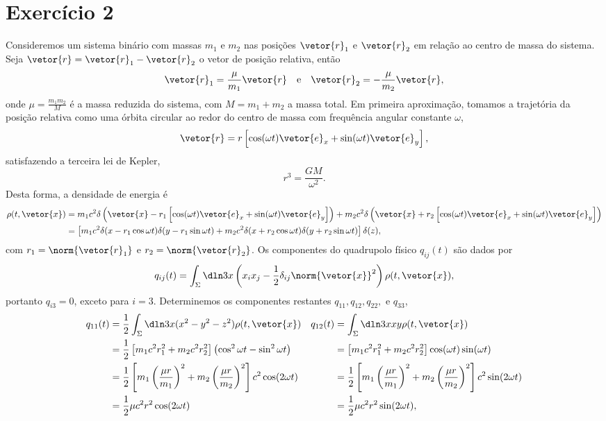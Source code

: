\section*{Exercício 2}
Consideremos um sistema binário com massas \(m_1\) e \(m_2\) nas posições \(\vetor{r}_1\) e \(\vetor{r}_2\) em relação ao centro de massa do sistema. Seja \(\vetor{r} = \vetor{r}_1 - \vetor{r}_2\) o vetor de posição relativa, então
\begin{equation*}
    \vetor{r}_1 = \frac{\mu}{m_1}\vetor{r}\quad\text{e}\quad \vetor{r}_2 =-\frac{\mu}{m_2}\vetor{r},
\end{equation*}
onde \(\mu = \frac{m_1m_2}{M}\) é a massa reduzida do sistema, com \(M = m_1 + m_2\) a massa total. Em primeira aproximação, tomamos a trajetória da posição relativa como uma órbita circular ao redor do centro de massa com frequência angular constante \(\omega\),
\begin{equation*}
    \vetor{r} = r \left[\cos(\omega t) \vetor{e}_x + \sin(\omega t)\vetor{e}_y\right],
\end{equation*}
satisfazendo a terceira lei de Kepler,
\begin{equation*}
    r^3 = \frac{GM}{\omega^2}.
\end{equation*}
Desta forma, a densidade de energia é
\begin{align*}
    \rho(t, \vetor{x}) &= m_1c^2\delta\left(\vetor{x} - r_1\left[\cos(\omega t) \vetor{e}_x + \sin(\omega t)\vetor{e}_y\right]\right) + m_2c^2 \delta\left(\vetor{x} + r_2\left[\cos(\omega t) \vetor{e}_x + \sin(\omega t)\vetor{e}_y\right]\right)\\
                       &= \left[m_1c^2 \delta(x - r_1 \cos\omega t)\delta(y - r_1\sin\omega t) + m_2c^2 \delta(x + r_2 \cos\omega t)\delta(y + r_2 \sin\omega t)\right]\delta(z),
\end{align*}
com \(r_1 = \norm{\vetor{r}_1}\) e \(r_2 = \norm{\vetor{r}_2}\). Os componentes do quadrupolo físico \(q_{ij}(t)\) são dados por
\begin{equation*}
    q_{ij}(t) = \int_{\Sigma} \dln3x\left(x_ix_j - \frac12 \delta_{ij}\norm{\vetor{x}}^2\right)\rho(t, \vetor{x}),
\end{equation*}
portanto \(q_{i3} = 0\), exceto para \(i = 3\). Determinemos os componentes restantes \(q_{11}, q_{12}, q_{22},\) e \(q_{33}\),
\begin{align*}
    q_{11}(t) &= \frac12 \int_{\Sigma}\dln3x (x^2 - y^2 - z^2) \rho(t, \vetor{x})&
    q_{12}(t) &= \int_{\Sigma}\dln3x xy \rho(t, \vetor{x})\\
              &= \frac12\left[m_1c^2 r_1^2 + m_2 c^2r_2^2\right] \left(\cos^2\omega t - \sin^2 \omega t\right)&
              &= \left[m_1 c^2 r_1^2 + m_2 c^2 r_2^2\right] \cos(\omega t)\sin(\omega t)\\
              &= \frac12 \left[m_1 \left(\frac{\mu r}{m_1}\right)^2 + m_2\left(\frac{\mu r}{m_2}\right)^2\right] c^2\cos(2\omega t)&
              &= \frac12\left[m_1\left(\frac{\mu r}{m_1}\right)^2 + m_2\left(\frac{\mu r}{m_2}\right)^2\right]c^2\sin(2\omega t)\\
              &= \frac12 \mu c^2 r^2\cos(2\omega t)&
              &= \frac12 \mu c^2 r^2 \sin(2\omega t),
\end{align*}
